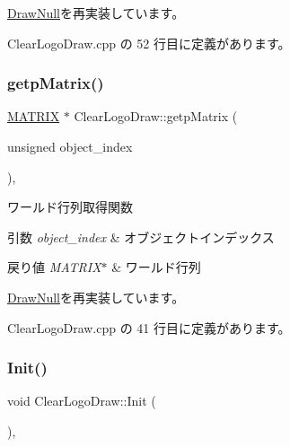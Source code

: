 \mbox{\hyperlink{class_draw_null_a0c1efe55fea325ad277594be6fe1e938}{Draw\+Null}}を再実装しています。



 Clear\+Logo\+Draw.\+cpp の 52 行目に定義があります。

\mbox{\label{class_clear_logo_draw_abcbd0cd8663e0262bcdd83356516082b}} 
\subsubsection{\texorpdfstring{getp\+Matrix()}{getpMatrix()}}
{\footnotesize\ttfamily \mbox{\hyperlink{_matrix_8h_a032295cd9fb1b711757c90667278e744}{M\+A\+T\+R\+IX}} $\ast$ Clear\+Logo\+Draw\+::getp\+Matrix (\begin{DoxyParamCaption}\item[{unsigned}]{object\+\_\+index }\end{DoxyParamCaption})\hspace{0.3cm}{\ttfamily [override]}, {\ttfamily [virtual]}}



ワールド行列取得関数 


\begin{DoxyParams}{引数}
{\em object\+\_\+index} & オブジェクトインデックス \\
\hline
\end{DoxyParams}

\begin{DoxyRetVals}{戻り値}
{\em M\+A\+T\+R\+I\+X$\ast$} & ワールド行列 \\
\hline
\end{DoxyRetVals}


\mbox{\hyperlink{class_draw_null_a9aac059eb3b5d1f77e8bd3aa0647cff9}{Draw\+Null}}を再実装しています。



 Clear\+Logo\+Draw.\+cpp の 41 行目に定義があります。

\mbox{\label{class_clear_logo_draw_a9af656c0a8ebfb5fa133a0983add6ffd}} 
\subsubsection{\texorpdfstring{Init()}{Init()}}
{\footnotesize\ttfamily void Clear\+Logo\+Draw\+::\+Init (\begin{DoxyParamCaption}{ }\end{DoxyParamCaption})\hspace{0.3cm}{\ttfamily [override]}, {\ttfamily [virtual]}}



